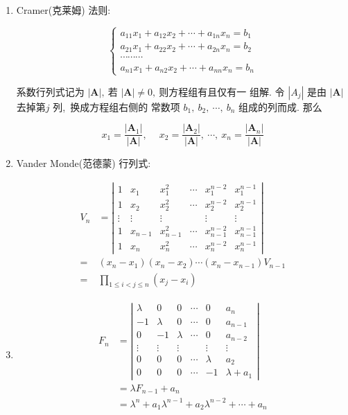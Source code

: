 \begin{enumerate}
		\item Cramer(克莱姆) 法则:
		
		$$\left\{\begin{array}{c}
			a_{11} x_{1}+a_{12} x_{2}+\cdots+a_{1 n} x_{n}=b_{1} \\
			a_{21} x_{1}+a_{22} x_{2}+\cdots+a_{2 n} x_{n}=b_{2} \\
			\cdots \cdots \cdots \\
			a_{n 1} x_{1}+a_{n 2} x_{2}+\cdots+a_{n n} x_{n}=b_{n}
		\end{array}\right.$$
		
		系数行列式记为  $|\boldsymbol{A}| ,\  $若 $|\boldsymbol{A}| \neq 0 ,\  $则方程组有且仅有一 组解. 令  $\left|A_{j}\right| $ 是由 $ |\boldsymbol{A}|  $去掉第$  j $ 列,\  换成方程组右侧的 常数项 $ b_{1},\  b_{2},\  \cdots,\  b_{n}$  组成的列而成. 那么
		
		$$x_{1}=\frac{\left|\boldsymbol{A}_{1}\right|}{|\boldsymbol{A}|},\  \quad x_{2}=\frac{\left|\boldsymbol{A}_{2}\right|}{|\boldsymbol{A}|},\  \cdots,\  x_{n}=\frac{\left|\boldsymbol{A}_{n}\right|}{|\boldsymbol{A}|}$$
		
		\item Vander Monde(范德蒙) 行列式:
		
		$$	\begin{aligned}
			V_{n} &=\left|\begin{array}{cccccc}
				1 & x_{1} & x_{1}^{2} & \cdots & x_{1}^{n-2} & x_{1}^{n-1} \\
				1 & x_{2} & x_{2}^{2} & \cdots & x_{2}^{n-2} & x_{2}^{n-1} \\
				\vdots & \vdots & \vdots & & \vdots & \vdots \\
				1 & x_{n-1} & x_{n-1}^{2} & \cdots & x_{n-1}^{n-2} & x_{n-1}^{n-1} \\
				1 & x_{n} & x_{n}^{2} & \cdots & x_{n}^{n-2} & x_{n}^{n-1}
			\end{array}\right| \\
			=&\left(x_{n}-x_{1}\right)\left(x_{n}-x_{2}\right) \cdots\left(x_{n}-x_{n-1}\right) V_{n-1} \\
			=& \prod_{1 \leqslant i<j \leqslant n}\left(x_{j}-x_{i}\right)
		\end{aligned}$$
		
		\item
		$$\begin{aligned}
			F_{n} &=\left|\begin{array}{cccccc}
				\lambda & 0 & 0 & \cdots & 0 & a_{n} \\
				-1 & \lambda & 0 & \cdots & 0 & a_{n-1} \\
				0 & -1 & \lambda & \cdots & 0 & a_{n-2} \\
				\vdots & \vdots & \vdots & & \vdots & \vdots \\
				0 & 0 & 0 & \cdots & \lambda & a_{2} \\
				0 & 0 & 0 & \cdots & -1 & \lambda+a_{1}
			\end{array}\right| \\
			&=\lambda F_{n-1}+a_{n} \\
			&=\lambda^{n}+a_{1} \lambda^{n-1}+a_{2} \lambda^{n-2}+\cdots+a_{n}
		\end{aligned}$$
		

\end{enumerate}

